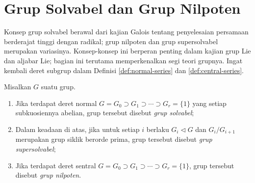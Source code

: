 \section{Grup Solvabel dan Grup Nilpoten}\label{sec:solvable-groups}
Konsep grup solvabel berawal dari kajian Galois tentang penyelesaian persamaan berderajat tinggi dengan radikal; grup nilpoten dan grup supersolvabel merupakan variasinya. Konsep-konsep ini berperan penting dalam kajian grup Lie dan aljabar Lie; bagian ini terutama memperkenalkan segi teori grupnya. Ingat kembali deret subgrup dalam Definisi \ref{def:normal-series} dan \ref{def:central-series}.

\begin{definition}\label{def:solvable-nilpotent-group}
	Misalkan $G$ suatu grup.
	\begin{enumerate}
		\item Jika terdapat deret normal $G = G_0 \supset G_1 \supset \cdots \supset G_r = \{1\}$ yang setiap subkuosiennya abelian, grup tersebut disebut \emph{grup solvabel};
		\item Dalam keadaan di atas, jika untuk setiap $i$ berlaku $G_i \lhd G$ dan $G_i/G_{i+1}$ merupakan grup siklik berorde prima, grup tersebut disebut \emph{grup supersolvabel};
		\item Jika terdapat deret sentral $G = G_0 \supset G_1 \supset \cdots \supset G_r = \{1\}$, grup tersebut disebut \emph{grup nilpoten}.
	\end{enumerate}
\end{definition}

